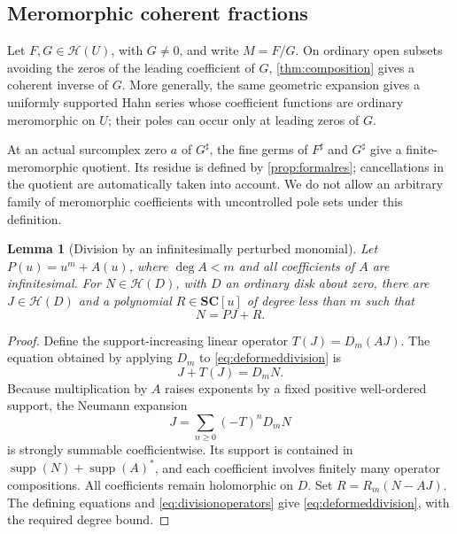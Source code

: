 \documentclass[11pt,letterpaper]{article}
\newtheorem{lemma}[theorem]{Lemma}
\theoremstyle{definition}
\theoremstyle{remark}
\newcommand{\SC}{\mathbf{SC}}
\newcommand{\HH}{\mathcal H}
\newcommand{\supp}{\operatorname{supp}}
\newcommand{\sh}{^{\sharp}}
\numberwithin{equation}{section}
\begin{document}
\subsection{Meromorphic coherent fractions}
Let $F,G\in\HH(U)$, with $G\ne0$, and write $M=F/G$. On ordinary open subsets avoiding the zeros of the leading coefficient of $G$, \cref{thm:composition} gives a coherent inverse of $G$. More generally, the same geometric expansion gives a uniformly supported Hahn series whose coefficient functions are ordinary meromorphic on $U$; their poles can occur only at leading zeros of $G$.

At an actual surcomplex zero $a$ of $G\sh$, the fine germs of $F\sh$ and $G\sh$ give a finite-meromorphic quotient. Its residue is defined by \cref{prop:formalres}; cancellations in the quotient are automatically taken into account. We do not allow an arbitrary family of meromorphic coefficients with uncontrolled pole sets under this definition.

\begin{lemma}[Division by an infinitesimally perturbed monomial]\label{lem:deformeddivision}
Let $P(u)=u^m+A(u)$, where $\deg A<m$ and all coefficients of $A$ are infinitesimal. For $N\in\HH(D)$, with $D$ an ordinary disk about zero, there are $J\in\HH(D)$ and a polynomial $R\in\SC[u]$ of degree less than $m$ such that
\begin{equation}\label{eq:deformeddivision}
 N=PJ+R.
\end{equation}
\end{lemma}
\begin{proof}
Define the support-increasing linear operator $T(J)=D_m(AJ)$. The equation obtained by applying $D_m$ to \eqref{eq:deformeddivision} is
\[
 J+T(J)=D_mN.
\]
Because multiplication by $A$ raises exponents by a fixed positive well-ordered support, the Neumann expansion
\[
 J=\sum_{n\ge0}(-T)^nD_mN
\]
is strongly summable coefficientwise. Its support is contained in $\supp(N)+\supp(A)^*$, and each coefficient involves finitely many operator compositions. All coefficients remain holomorphic on $D$. Set $R=R_m(N-AJ)$. The defining equations and \eqref{eq:divisionoperators} give \eqref{eq:deformeddivision}, with the required degree bound.
\end{proof}
\end{document}
